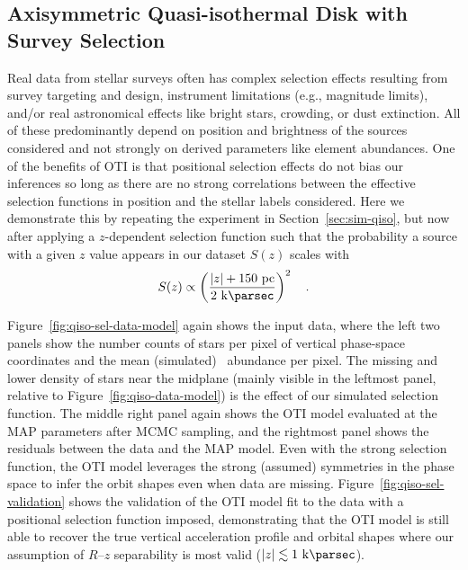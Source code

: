 \documentclass[modern]{aastex631}
\begin{document}
\subsection{Axisymmetric Quasi-isothermal Disk with Survey Selection}
\label{sec:sim-qiso-sel}

Real data from stellar surveys often has complex selection effects resulting from survey
targeting and design, instrument limitations (e.g., magnitude limits), and/or real
astronomical effects like bright stars, crowding, or dust extinction.
All of these predominantly depend on position and brightness of the sources considered
and not strongly on derived parameters like element abundances.
One of the benefits of OTI is that positional selection effects do not bias our
inferences so long as there are no strong correlations between the effective selection
functions in position and the stellar labels considered.
Here we demonstrate this by repeating the experiment in Section~\ref{sec:sim-qiso}, but
now after applying a $z$-dependent selection function such that the probability a source
with a given $z$ value appears in our dataset $S(z)$ scales with
\begin{equation}
    S(z) \propto \left(\frac{|z| + 150~\unit{pc}}{2~\kpc}\right)^2 \quad .
\end{equation}

Figure~\ref{fig:qiso-sel-data-model} again shows the input data, where the left two
panels show the number counts of stars per pixel of vertical phase-space coordinates and
the mean (simulated) \mgfe\ abundance per pixel.
The missing and lower density of stars near the midplane (mainly visible in the leftmost
panel, relative to Figure~\ref{fig:qiso-data-model}) is the effect of our simulated
selection function.
The middle right panel again shows the OTI model evaluated at the MAP parameters after
MCMC sampling, and the rightmost panel shows the residuals between the data and the MAP
model.
Even with the strong selection function, the OTI model leverages the strong (assumed)
symmetries in the phase space to infer the orbit shapes even when data are missing.
Figure~\ref{fig:qiso-sel-validation} shows the validation of the OTI model fit to the
data with a positional selection function imposed, demonstrating that the OTI model is
still able to recover the true vertical acceleration profile and orbital shapes where
our assumption of $R$--$z$ separability is most valid ($|z| \lesssim 1~\kpc$).
\end{document}
